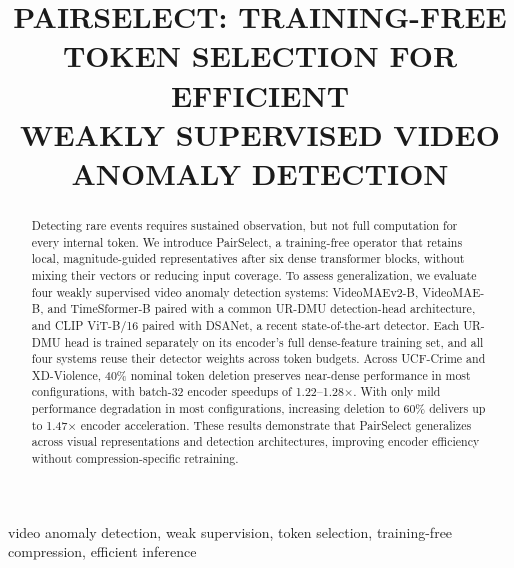 \documentclass[10pt,letterpaper]{article}
\title{PAIRSELECT: TRAINING-FREE TOKEN SELECTION FOR EFFICIENT\\WEAKLY SUPERVISED VIDEO ANOMALY DETECTION}
\begin{document}
\ninept
\maketitle
\begin{abstract}
Detecting rare events requires sustained observation, but not full computation for every internal token. We introduce PairSelect, a training-free operator that retains local, magnitude-guided representatives after six dense transformer blocks, without mixing their vectors or reducing input coverage. To assess generalization, we evaluate four weakly supervised video anomaly detection systems: VideoMAEv2-B, VideoMAE-B, and TimeSformer-B paired with a common UR-DMU detection-head architecture, and CLIP ViT-B/16 paired with DSANet, a recent state-of-the-art detector. Each UR-DMU head is trained separately on its encoder’s full dense-feature training set, and all four systems reuse their detector weights across token budgets. Across UCF-Crime and XD-Violence, 40\% nominal token deletion preserves near-dense performance in most configurations, with batch-32 encoder speedups of 1.22--1.28$\times$. With only mild performance degradation in most configurations, increasing deletion to 60\% delivers up to 1.47$\times$ encoder acceleration. These results demonstrate that PairSelect generalizes across visual representations and detection architectures, improving encoder efficiency without compression-specific retraining.
\end{abstract}
\begin{keywords}
video anomaly detection, weak supervision, token selection, training-free compression, efficient inference
\end{keywords}




\balance


\label{lasttechnical}
\clearpage
\balance

\begingroup
\small


\endgroup
\end{document}
